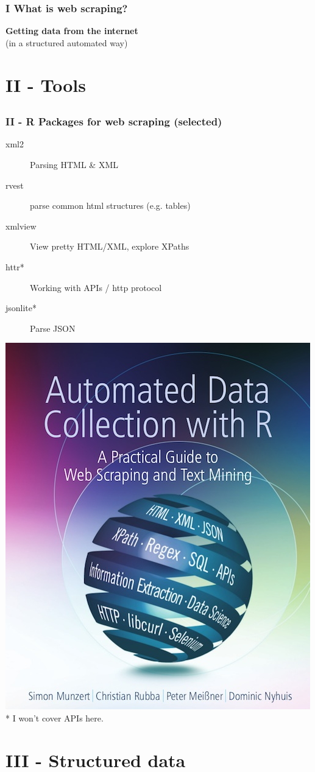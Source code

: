 \documentclass[12pt, t]{beamer}
\begin{document}
\begin{frame}[c]
\frametitle{I What is web scraping?}
\begin{center}
\Huge
\textbf{Getting data from the internet} \\ \pause
\normalsize
\vspace{0.5em}
(in a structured automated way)
\end{center}
\end{frame}



\section{II - Tools}
\subsection{}
\begin{frame}
\frametitle{II - R Packages for web scraping (selected)}
\begin{description}
\item[\textcolor{hilight}{xml2}]{Parsing HTML \& XML}	
\item[\textcolor{hilight}{rvest}]{parse common html structures (e.g. tables)}
\item[\textcolor{hilight}{xmlview}]{View pretty HTML/XML, explore XPaths}
\item[httr*]{Working with APIs / http protocol}
\item[jsonlite*]{Parse JSON}
\end{description}
\pause
\includegraphics[width=.3\textwidth]{fig/adcr-cover-wiley4.jpg} \\
\tiny
* I won't cover APIs here.
\end{frame}


\section{III - Structured data}
\end{document}
